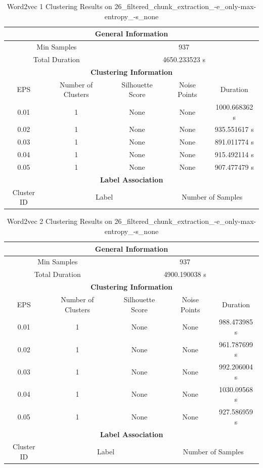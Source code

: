 \begin{longtable}{|c|c|c|c|c|}
\caption{Word2vec 1 Clustering Results on 26\_filtered\_chunk\_extraction\_-e\_only-max-entropy\_-s\_none} \label{tab:26_filtered_chunk_extraction_-e_only-max-entropy_-s_none_word2vec_1_clustering_results}\\
\hline
\multicolumn{5}{|c|}{\textbf{General Information}} \\
\hline
\multicolumn{2}{|c|}{Min Samples} & \multicolumn{3}{c|}{937} \\
\multicolumn{2}{|c|}{Total Duration} & \multicolumn{3}{c|}{4650.233523 s} \\
\hline
\multicolumn{5}{|c|}{\textbf{Clustering Information}} \\
\hline
EPS & Number of Clusters & Silhouette Score & Noise Points & Duration \\
0.01 & 1 & None & None & 1000.668362 s\\
0.02 & 1 & None & None & 935.551617 s\\
0.03 & 1 & None & None & 891.011774 s\\
0.04 & 1 & None & None & 915.492114 s\\
0.05 & 1 & None & None & 907.477479 s\\
\hline
\multicolumn{5}{|c|}{\textbf{Label Association}} \\
\hline
Cluster ID & \multicolumn{2}{c|}{Label} & \multicolumn{2}{c|}{Number of Samples} \\
\hline
\end{longtable}


\begin{longtable}{|c|c|c|c|c|}
\caption{Word2vec 2 Clustering Results on 26\_filtered\_chunk\_extraction\_-e\_only-max-entropy\_-s\_none} \label{tab:26_filtered_chunk_extraction_-e_only-max-entropy_-s_none_word2vec_2_clustering_results}\\
\hline
\multicolumn{5}{|c|}{\textbf{General Information}} \\
\hline
\multicolumn{2}{|c|}{Min Samples} & \multicolumn{3}{c|}{937} \\
\multicolumn{2}{|c|}{Total Duration} & \multicolumn{3}{c|}{4900.190038 s} \\
\hline
\multicolumn{5}{|c|}{\textbf{Clustering Information}} \\
\hline
EPS & Number of Clusters & Silhouette Score & Noise Points & Duration \\
0.01 & 1 & None & None & 988.473985 s\\
0.02 & 1 & None & None & 961.787699 s\\
0.03 & 1 & None & None & 992.206004 s\\
0.04 & 1 & None & None & 1030.09568 s\\
0.05 & 1 & None & None & 927.586959 s\\
\hline
\multicolumn{5}{|c|}{\textbf{Label Association}} \\
\hline
Cluster ID & \multicolumn{2}{c|}{Label} & \multicolumn{2}{c|}{Number of Samples} \\
\hline
\end{longtable}


